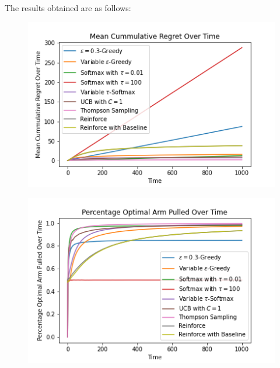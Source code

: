 \documentclass{article}
\begin{document}
		The results obtained are as follows:
		
		\begin{figure}[H]
		\graphicspath{ {../Experiments/Bernoulli_2_every_case/} }
		\centering
		\begin{minipage}{.5\textwidth}
		  \centering
		  \includegraphics[width=\linewidth]{Mean_Cummulative_Regret_Over_Time.png}
		  \label{fig:test1}
		\end{minipage}%
		\begin{minipage}{.5\textwidth}
		  \centering
		  \includegraphics[width=\linewidth]{Percentage_Optimal_Arm_Pulled_Over_Time.png}
		  \label{fig:test2}
		\end{minipage}
		\end{figure}
		
\end{document}
